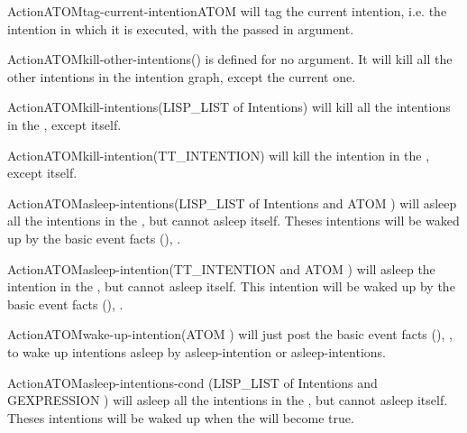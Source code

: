\begin{typeefa}{Action}{ATOM}{tag-current-intention}{ATOM }
will tag the current intention, i.e. the intention in which it is executed, with
the  passed in argument.
\end{typeefa}

\begin{typeefa}{Action}{ATOM}{kill-other-intentions}{()}
is defined for no argument. It will kill all the other intentions in the
intention graph, except the current one.
\end{typeefa}

\begin{typeefa}{Action}{ATOM}{kill-intentions}{(LISP\_LIST of Intentions)}
will kill all the intentions in the , except itself.
\end{typeefa}

\begin{typeefa}{Action}{ATOM}{kill-intention}{(TT\_INTENTION)}
will kill the intention in the , except itself.
\end{typeefa}

\begin{typeefa}{Action}{ATOM}{asleep-intentions}{(LISP\_LIST of Intentions and ATOM )}
will asleep all the intentions in the , but cannot asleep itself.
Theses intentions will be waked up by the basic event facts (),  .
\end{typeefa}

\begin{typeefa}{Action}{ATOM}{asleep-intention}{(TT\_INTENTION and ATOM )}
will asleep the intention in the , but cannot asleep itself.
This intention will be waked up by the basic event facts (),  .
\end{typeefa}

\begin{typeefa}{Action}{ATOM}{wake-up-intention}{(ATOM )}
will just post the basic event facts (),
, to wake up intentions
asleep by asleep-intention or asleep-intentions.
\end{typeefa}

\begin{typeefa}{Action}{ATOM}{asleep-intentions-cond}
{(LISP\_LIST of Intentions and GEXPRESSION )}
will asleep all the intentions in the , but cannot asleep itself.
Theses intentions will be waked up when the  will become true.
\end{typeefa}

